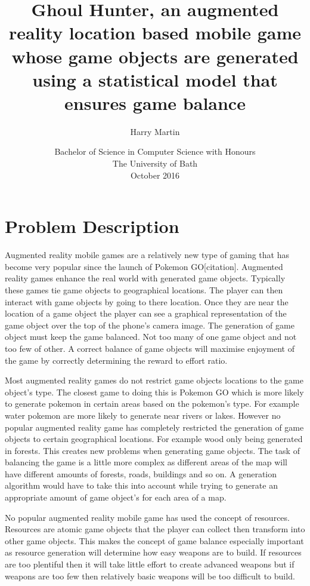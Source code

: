 \documentclass[11pt,openright,a4paper]{report}
\title{Ghoul Hunter, an augmented reality location based mobile game whose game objects are generated using a statistical model that ensures game balance}
\author{Harry Martin}
\date{Bachelor of Science in Computer Science with Honours\\The University of Bath\\October 2016}
\begin{document}
	
	\maketitle
	\section{Problem Description}
	Augmented reality mobile games are a relatively new type of gaming that has become very popular since the launch of Pokemon GO[citation]. Augmented reality games enhance the real world with generated game objects.  Typically these games tie game objects to geographical locations. The player can then interact with game objects by going to there location. Once they are near the location of a game object the player can see a graphical representation of the game object over the top of the phone's camera image. The generation of game object must keep the game balanced. Not too many of one game object and not too few of other. A correct balance of game objects will maximise enjoyment of the game by correctly determining the reward to effort ratio. 
	
	Most augmented reality games do not restrict game objects locations to the game object's type. The closest game to doing this is Pokemon GO which is more likely to generate pokemon  in certain areas based on the pokemon's type. For example water pokemon are more likely to generate near rivers or lakes. However no popular augmented reality game has completely restricted the generation of game objects to certain geographical locations. For example wood only being generated in forests. This creates new problems when generating game objects. The task of balancing the game is a little more complex as different areas of the map will have different amounts of forests, roads, buildings and so on. A generation algorithm would have to take this into account while trying to generate an appropriate amount of game object's for each area of a map. 
	
	No popular augmented reality mobile game has used the concept of resources. Resources are atomic game objects that the player can collect then transform into other game objects. This makes the concept of game balance especially important as resource generation will determine how easy weapons are to build. If resources are too plentiful then it will take little effort to create advanced weapons but if weapons are too few then relatively basic weapons will be too difficult to build. 
	
\end{document}
